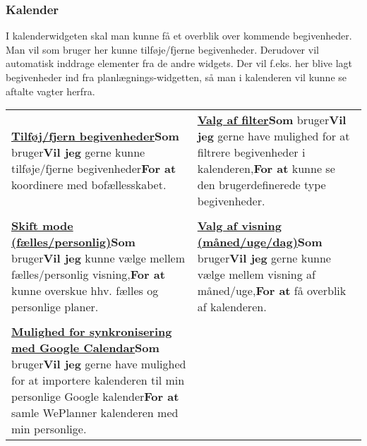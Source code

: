 \subsubsection{Kalender}

I kalenderwidgeten skal man kunne få et overblik over kommende begivenheder. Man vil som bruger her kunne tilføje/fjerne begivenheder. Derudover vil automatisk inddrage elementer fra de andre widgets. Der vil f.eks. her blive lagt begivenheder ind fra planlægnings-widgetten, så man i kalenderen vil kunne se aftalte vagter herfra. \\

\begin{tabular}{p{2.5in}p{2.5in}}
\textbf{\underline{Tilføj/fjern begivenheder}}\newline \textbf{Som} bruger\newline \textbf{Vil jeg} gerne kunne tilføje/fjerne begivenheder\newline \textbf{For at} koordinere med bofællesskabet. & 

\textbf{\underline{Valg af filter}}\newline \textbf{Som} bruger\newline \textbf{Vil jeg} gerne have mulighed for at filtrere begivenheder i kalenderen,\newline \textbf{For at} kunne se den brugerdefinerede type begivenheder.  \\\\ 

\textbf{\underline{Skift mode (fælles/personlig)}}\newline \textbf{Som} bruger\newline \textbf{Vil jeg} kunne vælge mellem fælles/personlig visning,\newline \textbf{For at} kunne overskue hhv. fælles og personlige planer.  & 

\textbf{\underline{Valg af visning (måned/uge/dag)}}\newline \textbf{Som} bruger\newline \textbf{Vil jeg} gerne kunne vælge mellem visning af måned/uge,\newline \textbf{For at} få overblik af kalenderen.  \\\\  

\textbf{\underline{Mulighed for synkronisering med Google Calendar}}\newline \textbf{Som} bruger\newline \textbf{Vil jeg} gerne have mulighed for at importere kalenderen til min personlige Google kalender\newline \textbf{For at} samle WePlanner kalenderen med min personlige.  &  \\
\end{tabular}

